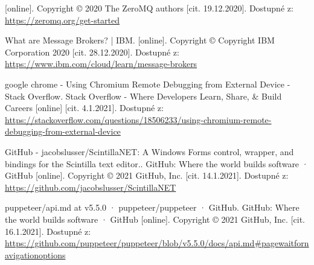 \begin{thebibliography}{99}
[online]. Copyright © 2020 The ZeroMQ authors [cit. 19.12.2020]. Dostupné z: \url{https://zeromq.org/get-started}

What are Message Brokers? | IBM. [online]. Copyright © Copyright IBM Corporation 2020 [cit. 28.12.2020]. Dostupné z: \url{https://www.ibm.com/cloud/learn/message-brokers}

google chrome - Using Chromium Remote Debugging from External Device - Stack Overflow. Stack Overflow - Where Developers Learn, Share, \& Build Careers [online] [cit. 4.1.2021]. Dostupné z: \url{https://stackoverflow.com/questions/18506233/using-chromium-remote-debugging-from-external-device}

GitHub - jacobslusser/ScintillaNET: A Windows Forms control, wrapper, and bindings for the Scintilla text editor.. GitHub: Where the world builds software · GitHub [online]. Copyright © 2021 GitHub, Inc. [cit. 14.1.2021]. Dostupné z: \url{https://github.com/jacobslusser/ScintillaNET}

puppeteer/api.md at v5.5.0 · puppeteer/puppeteer · GitHub. GitHub: Where the world builds software · GitHub [online]. Copyright © 2021 GitHub, Inc. [cit. 16.1.2021]. Dostupné z: \url{https://github.com/puppeteer/puppeteer/blob/v5.5.0/docs/api.md#pagewaitfornavigationoptions}

\end{thebibliography}
\newpage